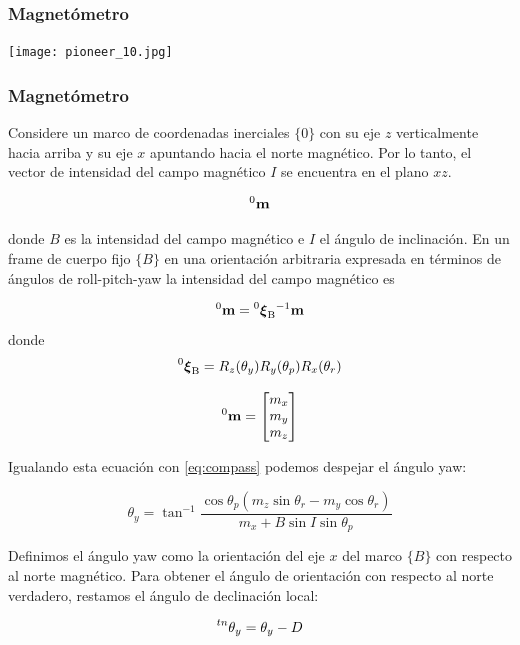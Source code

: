 \begin{frame}
    \frametitle{Magnetómetro}

    \begin{center}
        \texttt{[image: pioneer\_10.jpg]}
    \end{center}
\end{frame}


\begin{frame}
    \frametitle{Magnetómetro}
    \scriptsize
    Considere un marco de coordenadas inerciales $\{ 0 \}$ con su eje $z$ verticalmente hacia arriba y su eje $x$ apuntando hacia el norte magnético. Por lo tanto, el vector de intensidad del campo magnético $I$ se encuentra en el plano $xz$.

    \begin{equation*}
        \toCoord{\vec{m}}{0}
    \end{equation*}

    donde $B$ es la intensidad del campo magnético e $I$ el ángulo de inclinación. En un frame de cuerpo fijo $\{ B \}$ en una orientación arbitraria expresada en términos de ángulos de roll-pitch-yaw la intensidad del campo magnético es

    \begin{equation}
        \label{eq:compass}
        \toCoord{\vec{m}}{0} = \transform{0}{B}^{-1} \vec{m}
    \end{equation}
    donde
    \begin{equation*}
        \transform{0}{B} = R_{z}(\theta_{y}) R_{y}(\theta_{p}) R_{x}(\theta_{r})
    \end{equation*}

    \begin{equation*}
    \toCoord{\vec{m}}{0} =
    \begin{bmatrix}
        m_{x} \\
        m_{y} \\
        m_{z}
    \end{bmatrix}
    \end{equation*}

    Igualando esta ecuación con \ref{eq:compass} podemos despejar el ángulo yaw:

    \begin{equation*}
        \theta_{y} = \tan^{-1} \dfrac{\cos \theta_{p}  \left( m_{z} \sin \theta_{r} - m_{y} \cos \theta_{r} \right)} {m_{x} + B \sin I \sin \theta_{p}}
    \end{equation*}

    Definimos el ángulo yaw como la orientación del eje $x$ del marco $\{ B \}$ con respecto al norte magnético. Para obtener el ángulo de orientación con respecto al norte verdadero, restamos el ángulo de declinación local:

    \begin{equation*}
        \prescript{tn}{}{\theta_{y}} = \theta_{y} - D
    \end{equation*}

\end{frame}

